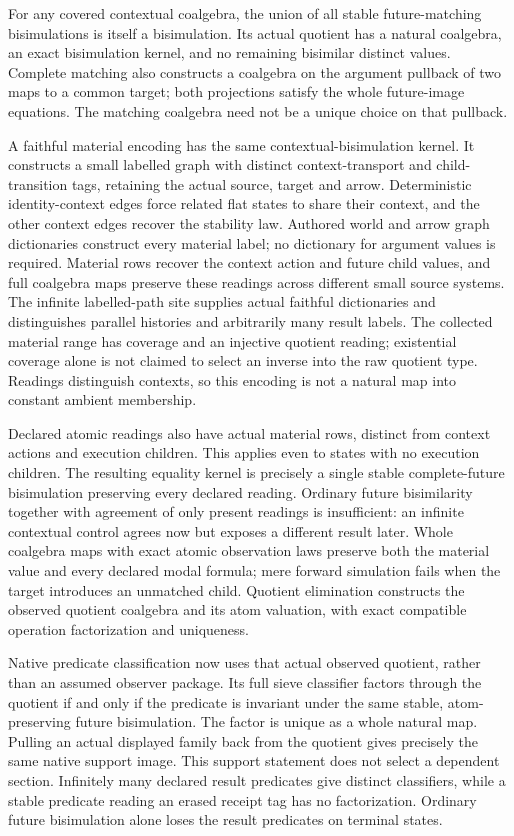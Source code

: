 \documentclass[11pt]{article}
\theoremstyle{definition}
\theoremstyle{remark}
\begin{document}
For any covered contextual coalgebra, the union of all stable
future-matching bisimulations is itself a bisimulation.  Its actual
quotient has a natural coalgebra, an exact bisimulation kernel, and no
remaining bisimilar distinct values.  Complete matching also constructs
a coalgebra on the argument pullback of two maps to a common target;
both projections satisfy the whole future-image equations.  The
matching coalgebra need not be a unique choice on that pullback.

A faithful material encoding has the same contextual-bisimulation kernel.
It constructs a small labelled graph with distinct context-transport and
child-transition tags, retaining the actual source, target and arrow.
Deterministic identity-context edges force related flat states to share
their context, and the other context edges recover the stability law.
Authored world and arrow graph dictionaries construct every material
label; no dictionary for argument values is required.  Material rows
recover the context action and future child values, and full coalgebra
maps preserve these readings across different small source systems.
The infinite labelled-path site supplies actual faithful dictionaries
and distinguishes parallel histories and arbitrarily many result labels.
The collected material range has coverage and an injective quotient
reading; existential coverage alone is not claimed to select an inverse
into the raw quotient type.  Readings distinguish contexts, so this
encoding is not a natural map into constant ambient membership.

Declared atomic readings also have actual material rows, distinct from
context actions and execution children.  This applies even to states with
no execution children.  The resulting equality kernel is precisely a
single stable complete-future bisimulation preserving every declared
reading.  Ordinary future bisimilarity together with agreement of only
present readings is insufficient: an infinite contextual control agrees
now but exposes a different result later.  Whole coalgebra maps with
exact atomic observation laws preserve both the material value and every
declared modal formula; mere forward simulation fails when the target
introduces an unmatched child.  Quotient elimination constructs the
observed quotient coalgebra and its atom valuation, with exact compatible
operation factorization and uniqueness.

Native predicate classification now uses that actual observed quotient,
rather than an assumed observer package. Its full sieve classifier factors
through the quotient if and only if the predicate is invariant under the
same stable, atom-preserving future bisimulation. The factor is unique as a
whole natural map. Pulling an actual displayed family back from the quotient
gives precisely the same native support image. This support statement does
not select a dependent section. Infinitely many declared result predicates
give distinct classifiers, while a stable predicate reading an erased
receipt tag has no factorization. Ordinary future bisimulation alone loses
the result predicates on terminal states.
\end{document}
